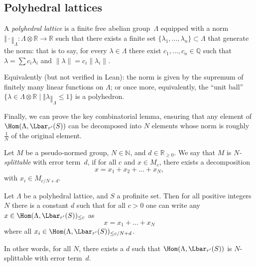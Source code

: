 \subsection{Polyhedral lattices}
\label{sec:polyhedral_lattice}

\begin{definition}
  \label{polyhedral_lattice}
  \leanok
  A \emph{polyhedral lattice} is a finite free abelian group~$\Lambda$
  equipped with a norm $‖\cdot‖_\Lambda \colon \Lambda\otimes \mathbb R\to \mathbb R$
  such that there exists a finite set $\{\lambda_1, \dots, \lambda_n\} \subset \Lambda$
  that generate the norm:
  that is to say, for every $\lambda \in \Lambda$ there exist
  $c_1, \dots, c_n \in \mathbb Q$ such that
  $\lambda = \sum c_i \lambda_i$ and $\|\lambda\| = c_i\|\lambda_i\|$.

  Equivalently (but not verified in Lean):
  the norm is given by the supremum of finitely many linear functions on $\Lambda$;
  or once more,
  equivalently, the ``unit ball''
  $\{\lambda\in \Lambda\otimes \mathbb R\mid ‖\lambda‖_\Lambda\leq 1\}$ is a polyhedron.
\end{definition}

Finally, we can prove the key combinatorial lemma,
ensuring that any element of $\Hom(\Lambda,\Lbar_{r'}(S))$
can be decomposed into $N$ elements whose norm is roughly $\tfrac 1N$ of the original element.

\begin{definition}
  \label{splittable}
  \leanok
  Let $M$ be a pseudo-normed group, $N \in \mathbb N$, and $d \in \mathbb R_{\ge 0}$.
  We say that $M$ is \emph{$N$-splittable} with error term~$d$,
  if for all $c$ and $x \in M_c$,
  there exists a decomposition
  \[
    x = x_1 + x_2 + \dots + x_N,
  \]
  with $x_i \in M_{c/N + d}$.
\end{definition}

\begin{proposition}
  \label{Lbar-splittable}
  \leanok
  Let $\Lambda$ be a polyhedral lattice, and $S$ a profinite set.
  Then for all positive integers $N$ there is a constant $d$
  such that for all $c>0$ one can write any
  $x\in \Hom(\Lambda,\Lbar_{r'}(S))_{\leq c}$ as
  \[
    x=x_1+\ldots+x_N
  \]
  where all $x_i\in \Hom(\Lambda,\Lbar_{r'}(S))_{\leq c/N+d}$.

  In other words, for all $N$, there exists a $d$ such that
  $\Hom(\Lambda, \Lbar_{r'}(S))$ is $N$-splittable with error term~$d$.
\end{proposition}

